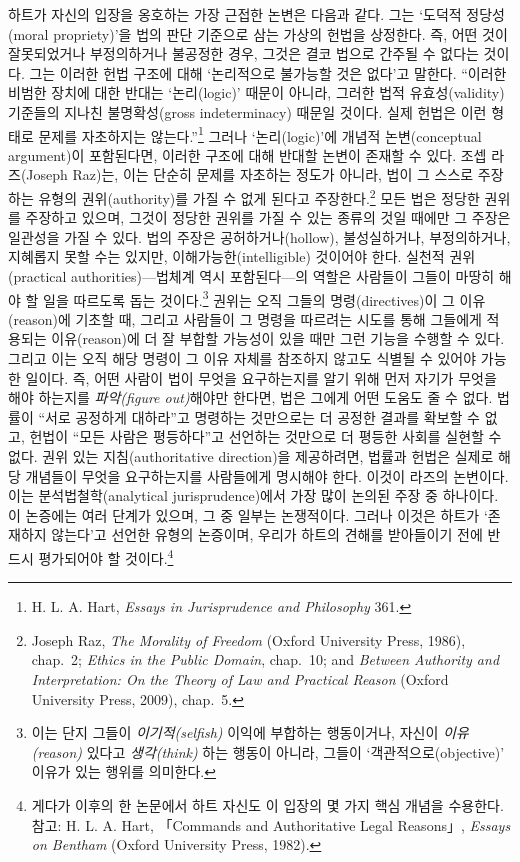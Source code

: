 \documentclass[12pt, oneside]{book}  %
\begin{document}
하트가 자신의 입장을 옹호하는 가장 근접한 논변은 다음과 같다. 그는
`도덕적 정당성(moral propriety)'을 법의 판단 기준으로 삼는 가상의 헌법을
상정한다. 즉, 어떤 것이 잘못되었거나 부정의하거나 불공정한 경우, 그것은
결코 법으로 간주될 수 없다는 것이다. 그는 이러한 헌법 구조에 대해
`논리적으로 불가능할 것은 없다'고 말한다. ``이러한 비범한 장치에 대한
반대는 `논리(logic)' 때문이 아니라, 그러한 법적 유효성(validity)
기준들의 지나친 불명확성(gross indeterminacy) 때문일 것이다. 실제 헌법은
이런 형태로 문제를 자초하지는 않는다.''\footnote{H. L. A. Hart,
  \emph{Essays in Jurisprudence and Philosophy} 361.} 그러나
`논리(logic)'에 개념적 논변(conceptual argument)이 포함된다면, 이러한
구조에 대해 반대할 논변이 존재할 수 있다. 조셉 라즈(Joseph Raz)는, 이는
단순히 문제를 자초하는 정도가 아니라, 법이 그 스스로 주장하는 유형의
권위(authority)를 가질 수 없게 된다고 주장한다.\footnote{Joseph Raz,
  \emph{The Morality of Freedom} (Oxford University Press, 1986),
  chap.~2; \emph{Ethics in the Public Domain}, chap.~10; and
  \emph{Between Authority and Interpretation: On the Theory of Law and
  Practical Reason} (Oxford University Press, 2009), chap.~5.} 모든 법은
정당한 권위를 주장하고 있으며, 그것이 정당한 권위를 가질 수 있는 종류의
것일 때에만 그 주장은 일관성을 가질 수 있다. 법의 주장은
공허하거나(hollow), 불성실하거나, 부정의하거나, 지혜롭지 못할 수는
있지만, 이해가능한(intelligible) 것이어야 한다. 실천적 권위(practical
authorities)---법체계 역시 포함된다---의 역할은 사람들이 그들이 마땅히
해야 할 일을 따르도록 돕는 것이다.\footnote{이는 단지 그들이
  \emph{이기적(selfish)} 이익에 부합하는 행동이거나, 자신이
  \emph{이유(reason)} 있다고 \emph{생각(think)} 하는 행동이 아니라,
  그들이 `객관적으로(objective)' 이유가 있는 행위를 의미한다.} 권위는
오직 그들의 명령(directives)이 그 이유(reason)에 기초할 때, 그리고
사람들이 그 명령을 따르려는 시도를 통해 그들에게 적용되는 이유(reason)에
더 잘 부합할 가능성이 있을 때만 그런 기능을 수행할 수 있다. 그리고 이는
오직 해당 명령이 그 이유 자체를 참조하지 않고도 식별될 수 있어야 가능한
일이다. 즉, 어떤 사람이 법이 무엇을 요구하는지를 알기 위해 먼저 자기가
무엇을 해야 하는지를 \emph{파악(figure out)}해야만 한다면, 법은 그에게
어떤 도움도 줄 수 없다. 법률이 ``서로 공정하게 대하라''고 명령하는
것만으로는 더 공정한 결과를 확보할 수 없고, 헌법이 ``모든 사람은
평등하다''고 선언하는 것만으로 더 평등한 사회를 실현할 수 없다. 권위
있는 지침(authoritative direction)을 제공하려면, 법률과 헌법은 실제로
해당 개념들이 무엇을 요구하는지를 사람들에게 명시해야 한다. 이것이
라즈의 논변이다. 이는 분석법철학(analytical jurisprudence)에서 가장 많이
논의된 주장 중 하나이다. 이 논증에는 여러 단계가 있으며, 그 중 일부는
논쟁적이다. 그러나 이것은 하트가 `존재하지 않는다'고 선언한 유형의
논증이며, 우리가 하트의 견해를 받아들이기 전에 반드시 평가되어야 할
것이다.\footnote{게다가 이후의 한 논문에서 하트 자신도 이 입장의 몇 가지
  핵심 개념을 수용한다. 참고: H. L. A. Hart, 「Commands and
  Authoritative Legal Reasons」, \emph{Essays on Bentham} (Oxford
  University Press, 1982).}
\end{document}
